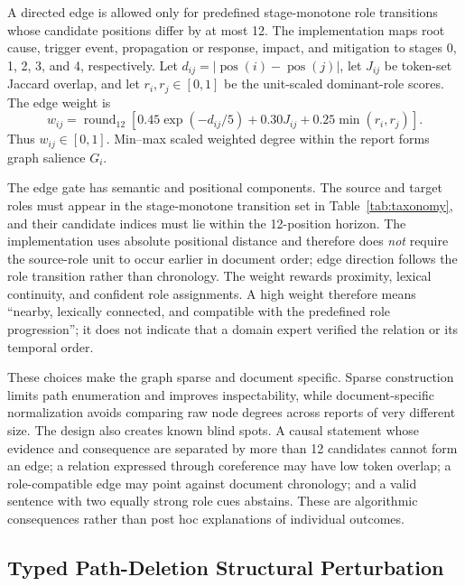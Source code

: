 \documentclass[information,article,submit,moreauthors]{Definitions/mdpi}
\begin{document}
A directed edge is allowed only for predefined stage-monotone role transitions whose candidate positions differ by at most 12. The implementation maps root cause, trigger event, propagation or response, impact, and mitigation to stages 0, 1, 2, 3, and 4, respectively. Let $d_{ij}=|\operatorname{pos}(i)-\operatorname{pos}(j)|$, let $J_{ij}$ be token-set Jaccard overlap, and let $r_i,r_j\in[0,1]$ be the unit-scaled dominant-role scores. The edge weight is
\begin{equation}
w_{ij}=\operatorname{round}_{12}\!\left[0.45\exp(-d_{ij}/5)+0.30J_{ij}+0.25\min(r_i,r_j)\right].
\label{eq:edge-weight}
\end{equation}
Thus $w_{ij}\in[0,1]$. Min--max scaled weighted degree within the report forms graph salience $G_i$.

The edge gate has semantic and positional components. The source and target roles must appear in the stage-monotone transition set in Table~\ref{tab:taxonomy}, and their candidate indices must lie within the 12-position horizon. The implementation uses absolute positional distance and therefore does \emph{not} require the source-role unit to occur earlier in document order; edge direction follows the role transition rather than chronology. The weight rewards proximity, lexical continuity, and confident role assignments. A high weight therefore means ``nearby, lexically connected, and compatible with the predefined role progression''; it does not indicate that a domain expert verified the relation or its temporal order.

These choices make the graph sparse and document specific. Sparse construction limits path enumeration and improves inspectability, while document-specific normalization avoids comparing raw node degrees across reports of very different size. The design also creates known blind spots. A causal statement whose evidence and consequence are separated by more than 12 candidates cannot form an edge; a relation expressed through coreference may have low token overlap; a role-compatible edge may point against document chronology; and a valid sentence with two equally strong role cues abstains. These are algorithmic consequences rather than post hoc explanations of individual outcomes.

\subsection{Typed Path-Deletion Structural Perturbation}
\label{sec:path-deletion}
\end{document}

